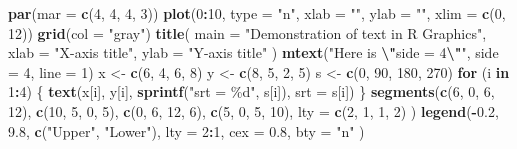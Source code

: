\documentclass[
  b5paper,
  UTF8,twoside]{book}
\newenvironment{Shaded}{\begin{snugshade}}{\end{snugshade}}
\newcommand{\AttributeTok}[1]{\textcolor[rgb]{0.13,0.29,0.53}{#1}}
\newcommand{\ControlFlowTok}[1]{\textcolor[rgb]{0.13,0.29,0.53}{\textbf{#1}}}
\newcommand{\DecValTok}[1]{\textcolor[rgb]{0.00,0.00,0.81}{#1}}
\newcommand{\FloatTok}[1]{\textcolor[rgb]{0.00,0.00,0.81}{#1}}
\newcommand{\FunctionTok}[1]{\textcolor[rgb]{0.13,0.29,0.53}{\textbf{#1}}}
\newcommand{\NormalTok}[1]{#1}
\newcommand{\OtherTok}[1]{\textcolor[rgb]{0.56,0.35,0.01}{#1}}
\newcommand{\SpecialCharTok}[1]{\textcolor[rgb]{0.81,0.36,0.00}{\textbf{#1}}}
\newcommand{\StringTok}[1]{\textcolor[rgb]{0.31,0.60,0.02}{#1}}
\begin{document}
\begin{Shaded}
\begin{Highlighting}[]
\FunctionTok{par}\NormalTok{(}\AttributeTok{mar =} \FunctionTok{c}\NormalTok{(}\DecValTok{4}\NormalTok{, }\DecValTok{4}\NormalTok{, }\DecValTok{4}\NormalTok{, }\DecValTok{3}\NormalTok{))}
\FunctionTok{plot}\NormalTok{(}\DecValTok{0}\SpecialCharTok{:}\DecValTok{10}\NormalTok{, }\AttributeTok{type =} \StringTok{"n"}\NormalTok{, }\AttributeTok{xlab =} \StringTok{""}\NormalTok{, }\AttributeTok{ylab =} \StringTok{""}\NormalTok{, }\AttributeTok{xlim =} \FunctionTok{c}\NormalTok{(}\DecValTok{0}\NormalTok{, }\DecValTok{12}\NormalTok{))}
\FunctionTok{grid}\NormalTok{(}\AttributeTok{col =} \StringTok{"gray"}\NormalTok{)}
\FunctionTok{title}\NormalTok{(}
  \AttributeTok{main =} \StringTok{"Demonstration of text in R Graphics"}\NormalTok{,}
  \AttributeTok{xlab =} \StringTok{"X{-}axis title"}\NormalTok{, }\AttributeTok{ylab =} \StringTok{"Y{-}axis title"}
\NormalTok{)}
\FunctionTok{mtext}\NormalTok{(}\StringTok{"Here is }\SpecialCharTok{\textbackslash{}"}\StringTok{side = 4}\SpecialCharTok{\textbackslash{}"}\StringTok{"}\NormalTok{, }\AttributeTok{side =} \DecValTok{4}\NormalTok{, }\AttributeTok{line =} \DecValTok{1}\NormalTok{)}
\NormalTok{x }\OtherTok{\textless{}{-}} \FunctionTok{c}\NormalTok{(}\DecValTok{6}\NormalTok{, }\DecValTok{4}\NormalTok{, }\DecValTok{6}\NormalTok{, }\DecValTok{8}\NormalTok{)}
\NormalTok{y }\OtherTok{\textless{}{-}} \FunctionTok{c}\NormalTok{(}\DecValTok{8}\NormalTok{, }\DecValTok{5}\NormalTok{, }\DecValTok{2}\NormalTok{, }\DecValTok{5}\NormalTok{)}
\NormalTok{s }\OtherTok{\textless{}{-}} \FunctionTok{c}\NormalTok{(}\DecValTok{0}\NormalTok{, }\DecValTok{90}\NormalTok{, }\DecValTok{180}\NormalTok{, }\DecValTok{270}\NormalTok{)}
\ControlFlowTok{for}\NormalTok{ (i }\ControlFlowTok{in} \DecValTok{1}\SpecialCharTok{:}\DecValTok{4}\NormalTok{) \{}
  \FunctionTok{text}\NormalTok{(x[i], y[i], }\FunctionTok{sprintf}\NormalTok{(}\StringTok{"srt = \%d"}\NormalTok{, s[i]), }\AttributeTok{srt =}\NormalTok{ s[i])}
\NormalTok{\}}
\FunctionTok{segments}\NormalTok{(}\FunctionTok{c}\NormalTok{(}\DecValTok{6}\NormalTok{, }\DecValTok{0}\NormalTok{, }\DecValTok{6}\NormalTok{, }\DecValTok{12}\NormalTok{), }\FunctionTok{c}\NormalTok{(}\DecValTok{10}\NormalTok{, }\DecValTok{5}\NormalTok{, }\DecValTok{0}\NormalTok{, }\DecValTok{5}\NormalTok{), }\FunctionTok{c}\NormalTok{(}\DecValTok{0}\NormalTok{, }\DecValTok{6}\NormalTok{, }\DecValTok{12}\NormalTok{, }\DecValTok{6}\NormalTok{),}
  \FunctionTok{c}\NormalTok{(}\DecValTok{5}\NormalTok{, }\DecValTok{0}\NormalTok{, }\DecValTok{5}\NormalTok{, }\DecValTok{10}\NormalTok{),}
  \AttributeTok{lty =} \FunctionTok{c}\NormalTok{(}\DecValTok{2}\NormalTok{, }\DecValTok{1}\NormalTok{, }\DecValTok{1}\NormalTok{, }\DecValTok{2}\NormalTok{)}
\NormalTok{)}
\FunctionTok{legend}\NormalTok{(}\SpecialCharTok{{-}}\FloatTok{0.2}\NormalTok{, }\FloatTok{9.8}\NormalTok{, }\FunctionTok{c}\NormalTok{(}\StringTok{"Upper"}\NormalTok{, }\StringTok{"Lower"}\NormalTok{),}
  \AttributeTok{lty =} \DecValTok{2}\SpecialCharTok{:}\DecValTok{1}\NormalTok{, }\AttributeTok{cex =} \FloatTok{0.8}\NormalTok{,}
  \AttributeTok{bty =} \StringTok{"n"}
\NormalTok{)}
\end{Highlighting}
\end{Shaded}
\end{document}
